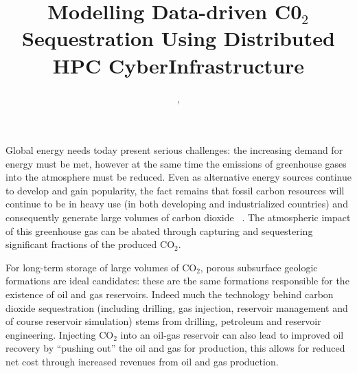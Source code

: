\documentclass[conference,final]{IEEEtran}
\begin{document}
\title{Modelling Data-driven C0$_{2}$ Sequestration Using Distributed HPC CyberInfrastructure}

 \author{,
    }


\maketitle



Global energy needs today present serious challenges: the increasing demand for energy must be met, however at the same time the emissions of greenhouse gases into the atmosphere must be reduced. Even as alternative energy sources continue to develop and gain popularity, the fact remains that fossil carbon resources will continue to be in heavy use (in both developing and industrialized countries) and consequently generate large volumes of carbon dioxide ~\cite{GeoRPT}. The atmospheric impact of this greenhouse gas can be abated through capturing and sequestering significant fractions of the produced CO$_2$.

For long-term storage of large volumes of CO$_2$, porous subsurface geologic formations are ideal candidates: these are the same formations responsible for the existence of oil and gas reservoirs. Indeed much the technology behind carbon dioxide sequestration (including drilling, gas injection, reservoir management and of course reservoir simulation) stems from drilling, petroleum and reservoir engineering. Injecting CO$_2$ into an oil-gas reservoir can also lead to improved oil recovery by ``pushing out'' the oil and gas for production, this allows for reduced net cost through increased revenues from oil and gas production. ~\cite{EORBook}
\end{document}
